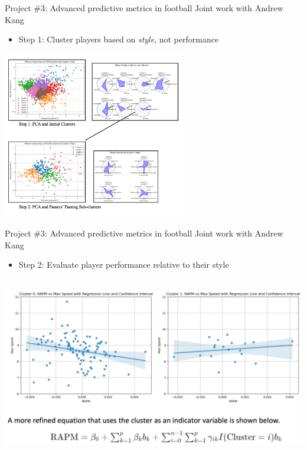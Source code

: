 \documentclass[handout]{beamer}
\begin{document}
\begin{frame}{Project \#3: Advanced predictive metrics in football}
  {Joint work with Andrew Kang}
  \begin{itemize}
    \item Step 1: Cluster players based on {\it style}, not performance
  \end{itemize}
  \centering
  \includegraphics[width = 0.6\textwidth]{images/opta_clusters.png}
\end{frame}


\begin{frame}{Project \#3: Advanced predictive metrics in football}
  {Joint work with Andrew Kang}
  \begin{itemize}
    \item Step 2: Evaluate player performance relative to their style
  \end{itemize}
  ~\\
  \includegraphics[width = \textwidth]{images/opta_bpm.png}
\end{frame}
\end{document}
